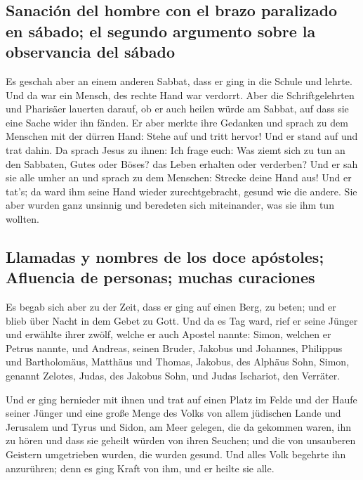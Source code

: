 \hypertarget{sanaciuxf3n-del-hombre-con-el-brazo-paralizado-en-suxe1bado-el-segundo-argumento-sobre-la-observancia-del-suxe1bado}{%
\subsection{Sanación del hombre con el brazo paralizado en sábado; el
segundo argumento sobre la observancia del
sábado}\label{sanaciuxf3n-del-hombre-con-el-brazo-paralizado-en-suxe1bado-el-segundo-argumento-sobre-la-observancia-del-suxe1bado}}

 Es geschah aber an einem anderen Sabbat, dass er ging in
die Schule und lehrte. Und da war ein Mensch, des rechte Hand war
verdorrt.  Aber die Schriftgelehrten und Pharisäer
lauerten darauf, ob er auch heilen würde am Sabbat, auf dass sie eine
Sache wider ihn fänden.  Er aber merkte ihre Gedanken und
sprach zu dem Menschen mit der dürren Hand: Stehe auf und tritt hervor!
Und er stand auf und trat dahin.  Da sprach Jesus zu
ihnen: Ich frage euch: Was ziemt sich zu tun an den Sabbaten, Gutes oder
Böses? das Leben erhalten oder verderben?  Und er sah sie
alle umher an und sprach zu dem Menschen: Strecke deine Hand aus! Und er
tat's; da ward ihm seine Hand wieder zurechtgebracht, gesund wie die
andere.  Sie aber wurden ganz unsinnig und beredeten sich
miteinander, was sie ihm tun wollten.

\hypertarget{llamadas-y-nombres-de-los-doce-apuxf3stoles-afluencia-de-personas-muchas-curaciones}{%
\subsection{Llamadas y nombres de los doce apóstoles; Afluencia de
personas; muchas
curaciones}\label{llamadas-y-nombres-de-los-doce-apuxf3stoles-afluencia-de-personas-muchas-curaciones}}

 Es begab sich aber zu der Zeit, dass er ging auf einen
Berg, zu beten; und er blieb über Nacht in dem Gebet zu Gott.
 Und da es Tag ward, rief er seine Jünger und erwählte
ihrer zwölf, welche er auch Apostel nannte:  Simon,
welchen er Petrus nannte, und Andreas, seinen Bruder, Jakobus und
Johannes, Philippus und Bartholomäus,  Matthäus und
Thomas, Jakobus, des Alphäus Sohn, Simon, genannt Zelotes,
 Judas, des Jakobus Sohn, und Judas Ischariot, den
Verräter.

 Und er ging hernieder mit ihnen und trat auf einen Platz
im Felde und der Haufe seiner Jünger und eine große Menge des Volks von
allem jüdischen Lande und Jerusalem und Tyrus und Sidon, am Meer
gelegen,  die da gekommen waren, ihn zu hören und dass
sie geheilt würden von ihren Seuchen; und die von unsauberen Geistern
umgetrieben wurden, die wurden gesund.  Und alles Volk
begehrte ihn anzurühren; denn es ging Kraft von ihm, und er heilte sie
alle.

